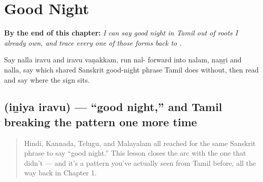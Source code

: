 
\chapter{Good Night}
\label{ch:ta-good-night}

\begin{chapteropening}
\textbf{By the end of this chapter:} \emph{I can say good night in Tamil out of roots I already own, and trace every one of those forms back to .}

Say nalla iravu and iravu vaṇakkam, run nal- forward into nalam, naṉṟi and nalla, say which shared Sanskrit good-night phrase Tamil does without, then read  and say where the  sign sits.
\end{chapteropening}

\section[\texorpdfstring{\ta{இனிய} \ta{இரவு} (iṉiya iravu)}{இனிய இரவு (iṉiya iravu)}]{  (iṉiya iravu) — \textquotedblleft{}good night,\textquotedblright{} and Tamil breaking the pattern one more time}

\label{lesson:TA-C25-iniya-iravu}



\begin{quote}
Hindi, Kannada, Telugu, and Malayalam all reached for the same Sanskrit phrase to say \textquotedblleft{}good night.\textquotedblright{} This lesson closes the arc with the one that didn't — and it's a pattern you've actually seen from Tamil before, all the way back in Chapter 1.
\end{quote}

